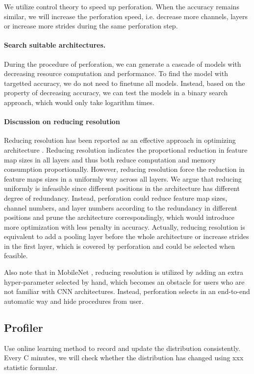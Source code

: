 \documentclass[pageno]{jpaper}
\begin{document}
We utilize control theory to speed up perforation. When the accuracy remains similar, we will increase the perforation speed, i.e. decrease more channels, layers or increase more strides during the same perforation step.

\paragraph{Search suitable architectures.}
During the procedure of perforation, we can generate a cascade of models with decreasing resource computation and performance. To find the model with targetted accuracy, we do not need to finetune all models. Instead, based on the property of decreasing accuracy, we can test the models in a binary search approach, which would only take logarithm times.

\paragraph{Discussion on reducing resolution}
Reducing resolution has been reported as an effective approach in optimizing architecture \cite{krizhevsky2009learning, fu2017look, howard2017mobilenets}. Reducing resolution indicates the proportional reduction in feature map sizes in all layers and thus both reduce computation and memory consumption proportionally. However, reducing resolution force the reduction in feature maps sizes in a uniformly way across all layers. We argue that reducing uniformly is infeasible since different positions in the architecture has different degree of redundancy. Instead, perforation could reduce feature map sizes, channel numbers, and layer numbers according to the redundancy in different positions and prune the architecture correspondingly, which would introduce more optimization with less penalty in accuracy. Actually, reducing resolution is equivalent to add a pooling layer before the whole architecture or increase strides in the first layer, which is covered by perforation and could be selected when feasible.

Also note that in MobileNet \cite{howard2017mobilenets}, reducing resolution is utilized by adding an extra hyper-parameter selected by hand, which becomes an obstacle for users who are not familiar with CNN architectures. Instead, perforation selects in an end-to-end automatic way and hide procedures from user.



\subsection{Profiler}
Use online learning method to record and update the distribution consistently. Every C minutes, we will check whether the distribution has changed using xxx statistic formular.
\end{document}
